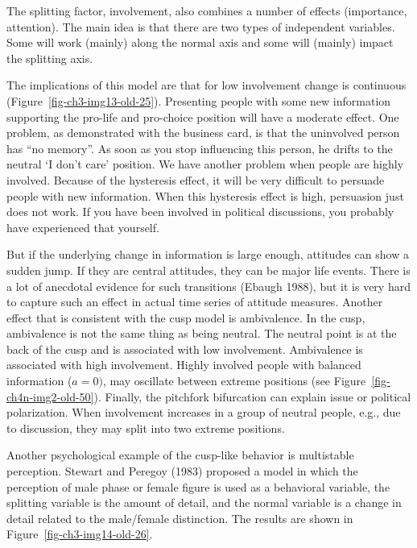\documentclass[
  a4paper,
  DIV=11,
  numbers=noendperiod,
  oneside]{scrreprt}
\begin{document}
The splitting factor, involvement, also combines a number of effects
(importance, attention). The main idea is that there are two types of
independent variables. Some will work (mainly) along the normal axis and
some will (mainly) impact the splitting axis.

The implications of this model are that for low involvement change is
continuous (Figure~\ref{fig-ch3-img13-old-25}). Presenting people with
some new information supporting the pro-life and pro-choice position
will have a moderate effect. One problem, as demonstrated with the
business card, is that the uninvolved person has ``no memory''. As soon
as you stop influencing this person, he drifts to the neutral `I don't
care' position. We have another problem when people are highly involved.
Because of the hysteresis effect, it will be very difficult to persuade
people with new information. When this hysteresis effect is high,
persuasion just does not work. If you have been involved in political
discussions, you probably have experienced that yourself.

But if the underlying change in information is large enough, attitudes
can show a sudden jump. If they are central attitudes, they can be major
life events. There is a lot of anecdotal evidence for such transitions
(Ebaugh 1988), but it is very hard to capture such an effect in actual
time series of attitude measures. Another effect that is consistent with
the cusp model is ambivalence. In the cusp, ambivalence is not the same
thing as being neutral. The neutral point is at the back of the cusp and
is associated with low involvement. Ambivalence is associated with high
involvement. Highly involved people with balanced information
(\(a = 0)\), may oscillate between extreme positions (see
Figure~\ref{fig-ch4n-img2-old-50}). Finally, the pitchfork bifurcation
can explain issue or political polarization. When involvement increases
in a group of neutral people, e.g., due to discussion, they may split
into two extreme positions.

Another psychological example of the cusp-like behavior is multistable
perception. Stewart and Peregoy (1983) proposed a model in which the
perception of male phase or female figure is used as a behavioral
variable, the splitting variable is the amount of detail, and the normal
variable is a change in detail related to the male/female distinction.
The results are shown in Figure~\ref{fig-ch3-img14-old-26}.
\end{document}
